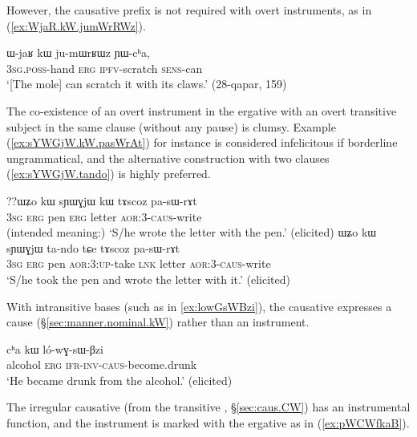 However, the causative prefix is not required with overt instruments, as in (\ref{ex:WjaR.kW.jumWrRWz}).

\begin{exe}
\ex \label{ex:WjaR.kW.jumWrRWz}
\gll ɯ-jaʁ kɯ ju-mɯrʁɯz ɲɯ-cʰa, \\
\textsc{3sg}.\textsc{poss}-hand \textsc{erg} \textsc{ipfv}-scratch \textsc{sens}-can \\
\glt `[The mole] can scratch it with its claws.' (28-qapar, 159)
\end{exe}

The co-existence of an overt instrument in the ergative with an overt transitive subject in the same clause (without any pause) is clumsy. Example (\ref{ex:sYWGjW.kW.pasWrAt}) for instance is considered infelicitous if borderline ungrammatical, and the alternative construction with two clauses (\ref{ex:sYWGjW.tando}) is highly preferred.

\begin{exe}
\ex 
\begin{xlist}
\ex \label{ex:sYWGjW.kW.pasWrAt}
\gll ??ɯʑo kɯ sɲɯɣjɯ kɯ tɤscoz pa-sɯ-rɤt \\
\textsc{3sg} \textsc{erg} pen \textsc{erg} letter \textsc{aor}:3\flobv{}-\textsc{caus}-write \\
\glt (intended meaning:) `S/he wrote the letter with the pen.' (elicited)
\ex \label{ex:sYWGjW.tando}
\gll ɯʑo kɯ sɲɯɣjɯ ta-ndo tɕe tɤscoz pa-sɯ-rɤt\\
\textsc{3sg} \textsc{erg} pen \textsc{aor}:3\flobv{}:\textsc{up}-take \textsc{lnk} letter \textsc{aor}:3\flobv{}-\textsc{caus}-write\\
\glt `S/he took the pen and wrote the letter with it.' (elicited)
\end{xlist}
\end{exe}

With intransitive bases (such as  in \ref{ex:lowGsWBzi}), the causative expresses a cause (§\ref{sec:manner.nominal.kW}) rather than an instrument.

\begin{exe}
\ex \label{ex:lowGsWBzi}
\gll cʰa kɯ ló-wɣ-sɯ-βzi \\ 
alcohol \textsc{erg} \textsc{ifr}-\textsc{inv}-\textsc{caus}-become.drunk \\
\glt `He became drunk from the alcohol.' (elicited)
\end{exe}

The irregular causative  (from the transitive , §\ref{sec:caus.CW}) has an instrumental function, and the instrument is marked with the ergative as in (\ref{ex:pWCWfkaB}).

